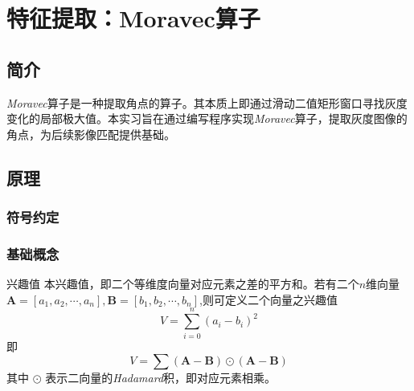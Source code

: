
\section{特征提取：Moravec算子}
\subsection{简介}
    \textit{Moravec}算子是一种提取角点的算子。其本质上即通过滑动二值矩形窗口寻找灰度变化的局部极大值。本实习旨在通过编写程序实现\textit{Moravec}算子，提取灰度图像的角点，为后续影像匹配提供基础。
\subsection{原理}
    \subsubsection{符号约定}

    \begin{table}[H]
        \centering
        \caption{符号约定}
        \label{moravec_symbol}
    \end{table}

    \subsubsection{基础概念}
        \begin{theorem}{兴趣值}
            本兴趣值，即二个等维度向量对应元素之差的平方和。若有二个$n$维向量$\bm{A}=[a_1,a_2,\cdots,a_n],\bm{B}=[b_1,b_2,\cdots,b_n]$,则可定义二个向量之兴趣值
            \begin{equation}
                \label{interestvalue}
                V= \sum_{i=0}^n (a_i-b_i)^2
            \end{equation}
            即
            \begin{equation}
                \label{interestvalue2}
                V =\sum (\bm{A}-\bm{B})\odot (\bm{A}-\bm{B})
            \end{equation}
            其中 $\odot$ 表示二向量的\textit{Hadamard}积，即对应元素相乘。
        \end{theorem}

